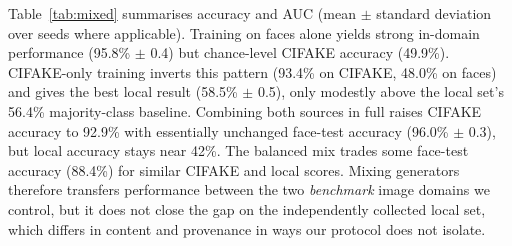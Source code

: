 \documentclass[11pt,a4paper]{article}
\begin{document}
Table~\ref{tab:mixed} summarises accuracy and AUC (mean $\pm$ standard deviation over seeds where applicable). Training on faces alone yields strong in-domain performance (95.8\% $\pm$ 0.4) but chance-level CIFAKE accuracy (49.9\%). CIFAKE-only training inverts this pattern (93.4\% on CIFAKE, 48.0\% on faces) and gives the best local result (58.5\% $\pm$ 0.5), only modestly above the local set's 56.4\% majority-class baseline. Combining both sources in full raises CIFAKE accuracy to 92.9\% with essentially unchanged face-test accuracy (96.0\% $\pm$ 0.3), but local accuracy stays near 42\%. The balanced mix trades some face-test accuracy (88.4\%) for similar CIFAKE and local scores. Mixing generators therefore transfers performance between the two \emph{benchmark} image domains we control, but it does not close the gap on the independently collected local set, which differs in content and provenance in ways our protocol does not isolate.

\begin{table}[h]
\centering
\caption{Training-source ablation: frozen ResNet50 features, MLP head, mean $\pm$ std over three seeds (accuracy / AUC).}\label{tab:mixed}
\scriptsize
{}
\end{table}
\end{document}
